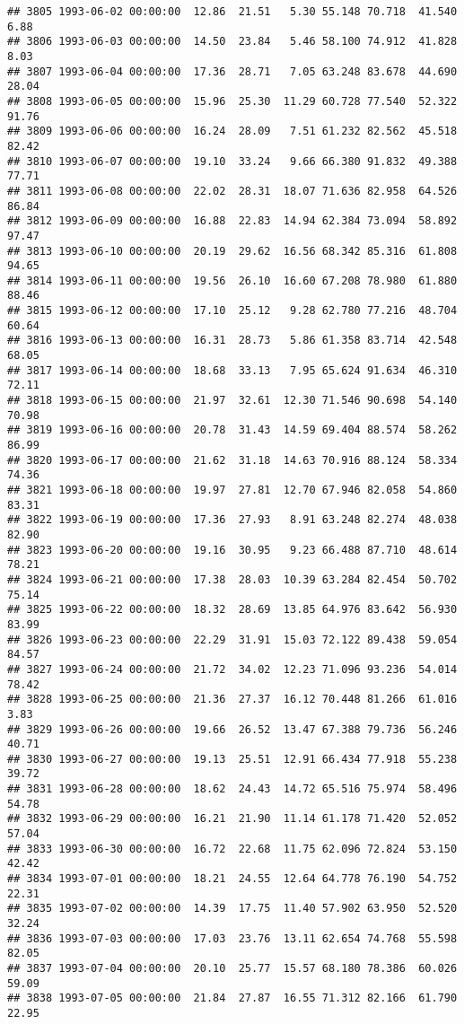 \documentclass{article}\usepackage{graphicx, color}
\makeatletter
\newenvironment{kframe}{%
 \def\at@end@of@kframe{}%
 \ifinner\ifhmode%
  \def\at@end@of@kframe{\end{minipage}}%
  \begin{minipage}{\columnwidth}%
 \fi\fi%
 \def\FrameCommand##1{\hskip\@totalleftmargin \hskip-\fboxsep
 \colorbox{shadecolor}{##1}\hskip-\fboxsep
     \hskip-\linewidth \hskip-\@totalleftmargin \hskip\columnwidth}%
 \MakeFramed {\advance\hsize-\width
   \@totalleftmargin\z@ \linewidth\hsize
   \@setminipage}}%
 {\par\unskip\endMakeFramed%
 \at@end@of@kframe}
\newenvironment{knitrout}{}{} %
\makeatother
\begin{document}
\begin{knitrout}
\begin{kframe}
\begin{verbatim}
## 3805 1993-06-02 00:00:00  12.86  21.51   5.30 55.148 70.718  41.540   6.88
## 3806 1993-06-03 00:00:00  14.50  23.84   5.46 58.100 74.912  41.828   8.03
## 3807 1993-06-04 00:00:00  17.36  28.71   7.05 63.248 83.678  44.690  28.04
## 3808 1993-06-05 00:00:00  15.96  25.30  11.29 60.728 77.540  52.322  91.76
## 3809 1993-06-06 00:00:00  16.24  28.09   7.51 61.232 82.562  45.518  82.42
## 3810 1993-06-07 00:00:00  19.10  33.24   9.66 66.380 91.832  49.388  77.71
## 3811 1993-06-08 00:00:00  22.02  28.31  18.07 71.636 82.958  64.526  86.84
## 3812 1993-06-09 00:00:00  16.88  22.83  14.94 62.384 73.094  58.892  97.47
## 3813 1993-06-10 00:00:00  20.19  29.62  16.56 68.342 85.316  61.808  94.65
## 3814 1993-06-11 00:00:00  19.56  26.10  16.60 67.208 78.980  61.880  88.46
## 3815 1993-06-12 00:00:00  17.10  25.12   9.28 62.780 77.216  48.704  60.64
## 3816 1993-06-13 00:00:00  16.31  28.73   5.86 61.358 83.714  42.548  68.05
## 3817 1993-06-14 00:00:00  18.68  33.13   7.95 65.624 91.634  46.310  72.11
## 3818 1993-06-15 00:00:00  21.97  32.61  12.30 71.546 90.698  54.140  70.98
## 3819 1993-06-16 00:00:00  20.78  31.43  14.59 69.404 88.574  58.262  86.99
## 3820 1993-06-17 00:00:00  21.62  31.18  14.63 70.916 88.124  58.334  74.36
## 3821 1993-06-18 00:00:00  19.97  27.81  12.70 67.946 82.058  54.860  83.31
## 3822 1993-06-19 00:00:00  17.36  27.93   8.91 63.248 82.274  48.038  82.90
## 3823 1993-06-20 00:00:00  19.16  30.95   9.23 66.488 87.710  48.614  78.21
## 3824 1993-06-21 00:00:00  17.38  28.03  10.39 63.284 82.454  50.702  75.14
## 3825 1993-06-22 00:00:00  18.32  28.69  13.85 64.976 83.642  56.930  83.99
## 3826 1993-06-23 00:00:00  22.29  31.91  15.03 72.122 89.438  59.054  84.57
## 3827 1993-06-24 00:00:00  21.72  34.02  12.23 71.096 93.236  54.014  78.42
## 3828 1993-06-25 00:00:00  21.36  27.37  16.12 70.448 81.266  61.016   3.83
## 3829 1993-06-26 00:00:00  19.66  26.52  13.47 67.388 79.736  56.246  40.71
## 3830 1993-06-27 00:00:00  19.13  25.51  12.91 66.434 77.918  55.238  39.72
## 3831 1993-06-28 00:00:00  18.62  24.43  14.72 65.516 75.974  58.496  54.78
## 3832 1993-06-29 00:00:00  16.21  21.90  11.14 61.178 71.420  52.052  57.04
## 3833 1993-06-30 00:00:00  16.72  22.68  11.75 62.096 72.824  53.150  42.42
## 3834 1993-07-01 00:00:00  18.21  24.55  12.64 64.778 76.190  54.752  22.31
## 3835 1993-07-02 00:00:00  14.39  17.75  11.40 57.902 63.950  52.520  32.24
## 3836 1993-07-03 00:00:00  17.03  23.76  13.11 62.654 74.768  55.598  82.05
## 3837 1993-07-04 00:00:00  20.10  25.77  15.57 68.180 78.386  60.026  59.09
## 3838 1993-07-05 00:00:00  21.84  27.87  16.55 71.312 82.166  61.790  22.95

\end{verbatim}
\end{kframe}
\end{knitrout}
\end{document}
